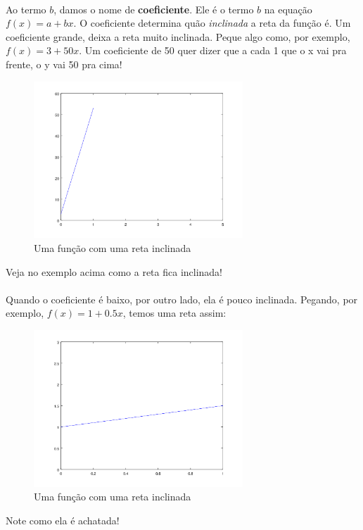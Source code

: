 \documentclass[11pt]{article}
\begin{document}
\paragraph{}
Ao termo $b$, damos o nome de \textbf{coeficiente}. Ele é o termo $b$ na
equação $f(x) = a + bx$. O coeficiente determina quão \textit{inclinada} a
reta da função é. Um coeficiente grande, deixa a reta muito inclinada. Peque
algo como, por exemplo, $f(x) = 3 + 50x$. Um coeficiente de 50 quer dizer
que a cada 1 que o x vai pra frente, o y vai 50 pra cima! 
\begin{figure}[H]
\centering
\includegraphics[width=0.7\textwidth]{imgs/reta_inclinada.png}
\caption[9pt]{Uma função com uma reta inclinada}
\end{figure}
Veja no exemplo acima como a reta fica inclinada!
\paragraph{}
Quando o coeficiente é baixo, por outro lado, ela é pouco inclinada. 
Pegando, por exemplo, $f(x) = 1 + 0.5x$, temos uma reta assim:
\begin{figure}[H]
\centering
\includegraphics[width=0.7\textwidth]{imgs/reta_reta.png}
\caption[9pt]{Uma função com uma reta inclinada}
\end{figure}
Note como ela é achatada!
\end{document}
